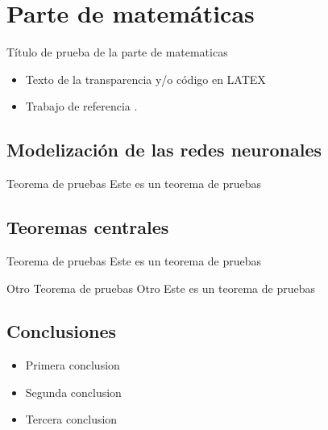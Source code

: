 \section{Parte de matemáticas}

\begin{frame}{Título de prueba de la parte de matematicas}
	\begin{itemize}
		\item Texto de la transparencia y/o código en LATEX
		\item Trabajo de referencia \cite{informatica:principal}.
	\end{itemize}
\end{frame}

\subsection{Modelización de las redes neuronales}
\begin{frame}
	\begin{block}{Teorema de pruebas}
		Este es un teorema de pruebas
	\end{block}
\end{frame}

\subsection{Teoremas centrales}
\begin{frame}
	\begin{block}{Teorema de pruebas}
		Este es un teorema de pruebas
	\end{block}

	\begin{block}{Otro Teorema de pruebas}
		Otro Este es un teorema de pruebas
	\end{block}
\end{frame}

\subsection{Conclusiones}
\begin{frame}
	\begin{itemize}
		\item Primera conclusion
		\item Segunda conclusion
		\item Tercera conclusion
	\end{itemize}
\end{frame}
